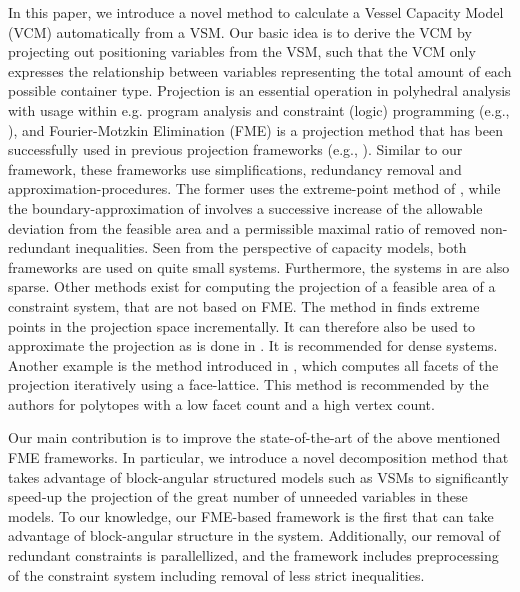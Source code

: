 \documentclass{llncs}
\begin{document}
In this paper, we introduce a novel method to calculate a Vessel Capacity Model (VCM) automatically from a VSM. Our basic idea is to derive the VCM by projecting out positioning variables from the VSM, such that the VCM only expresses the relationship between variables representing the total amount of each possible container type. 
Projection is an essential operation in polyhedral analysis with usage within e.g. program analysis and constraint (logic) programming (e.g., \cite{fordan98,lassez90,benoy05}), and Fourier-Motzkin Elimination (FME) is a projection method that has been successfully used in previous projection frameworks (e.g., \cite{simon05,lukatskii08,shapot12}). 
Similar to our framework, these frameworks use simplifications, redundancy removal and approximation-procedures. The former uses the extreme-point method of \cite{huynh92}, while the boundary-approximation of \cite{lukatskii08,shapot12} involves a successive increase of the allowable deviation from the feasible area and a permissible maximal ratio of removed non-redundant inequalities. Seen from the perspective of capacity models, both frameworks are used on quite small systems. Furthermore, the systems in \cite{simon05} are also sparse. 
Other methods exist for computing the projection of a feasible area of a constraint system, that are not based on FME. The method in \cite{huynh92} finds extreme points in the projection space incrementally. It can therefore also be used to approximate the projection as is done in \cite{simon05}. It is recommended for dense systems. Another example is the method introduced in \cite{jones04}, which computes all facets of the projection iteratively using a face-lattice. This method is recommended by the authors for polytopes with a low facet count and a high vertex count.

Our main contribution is to improve the state-of-the-art of the above mentioned FME frameworks.
In particular, we introduce a novel decomposition method that takes advantage of block-angular structured models such as VSMs to significantly speed-up the projection of the great number of unneeded variables in these models. To our knowledge, our FME-based framework is the first that can take advantage of block-angular structure in the system. Additionally, our removal of redundant constraints is parallellized, and the framework includes preprocessing of the constraint system including removal of less strict inequalities.
\end{document}
